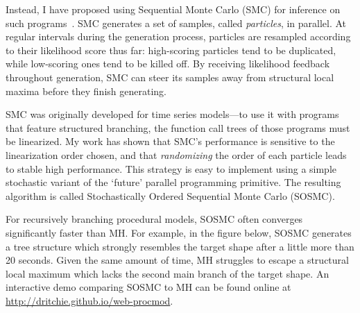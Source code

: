 \documentclass[
10pt, %
a4paper, %
oneside, %
headinclude,footinclude, %
BCOR5mm, %
]{scrartcl}
\begin{document}
Instead, I have proposed using Sequential Monte Carlo (SMC) for inference on such programs~\cite{SOSMC}. SMC generates a set of samples, called \emph{particles}, in parallel. At regular intervals during the generation process, particles are resampled according to their likelihood score thus far: high-scoring particles tend to be duplicated, while low-scoring ones tend to be killed off. By receiving likelihood feedback throughout generation, SMC can steer its samples away from structural local maxima before they finish generating.

SMC was originally developed for time series models---to use it with programs that feature structured branching, the function call trees of those programs must be linearized. My work has shown that SMC's performance is sensitive to the linearization order chosen, and that \emph{randomizing} the order of each particle leads to stable high performance. This strategy is easy to implement using a simple stochastic variant of the `future' parallel programming primitive. The resulting algorithm is called Stochastically Ordered Sequential Monte Carlo (SOSMC).

For recursively branching procedural models, SOSMC often converges significantly faster than MH. For example, in the figure below, SOSMC generates a tree structure which strongly resembles the target shape after a little more than 20 seconds. Given the same amount of time, MH struggles to escape a structural local maximum which lacks the second main branch of the target shape. An interactive demo comparing SOSMC to MH can be found online at \url{http://dritchie.github.io/web-procmod}.
\end{document}
